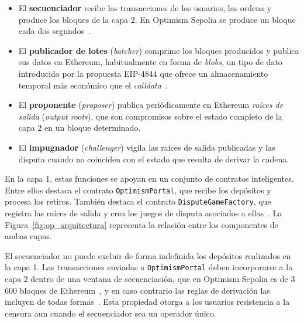 \begin{itemize}
	\item El \textbf{secuenciador} recibe las transacciones de los usuarios, las ordena y produce
	los bloques de la capa 2. En Optimism Sepolia se produce un bloque cada dos
	segundos~\cite{superchainopsepolia}.
	\item El \textbf{publicador de lotes} (\textit{batcher}) comprime los bloques producidos y
	publica sus datos en Ethereum, habitualmente en forma de \textit{blobs}, un tipo de dato
	introducido por la propuesta EIP-4844 que ofrece un almacenamiento temporal más económico que
	el \textit{calldata}~\cite{eip4844}.
	\item El \textbf{proponente} (\textit{proposer}) publica periódicamente en Ethereum
	\textit{raíces de salida} (\textit{output roots}), que son compromisos sobre el estado
	completo de la capa 2 en un bloque determinado.
	\item El \textbf{impugnador} (\textit{challenger}) vigila las raíces de salida publicadas y
	las disputa cuando no coinciden con el estado que resulta de derivar la cadena.
\end{itemize}

En la capa 1, estas funciones se apoyan en un conjunto de contratos inteligentes. Entre ellos
destaca el contrato \texttt{OptimismPortal}, que recibe los depósitos y procesa los retiros.
También destaca el contrato \texttt{DisputeGameFactory}, que registra las raíces de salida y crea
los juegos de disputa asociados a ellas~\cite{opspecsoverview}. La Figura~\ref{fig:op_arquitectura} representa la
relación entre los componentes de ambas capas.

El secuenciador no puede excluir de forma indefinida los depósitos realizados en la capa 1. Las
transacciones enviadas a \texttt{OptimismPortal} deben incorporarse a la capa 2 dentro de una
ventana de secuenciación, que en Optimism Sepolia es de 3\,600 bloques de
Ethereum~\cite{superchainopsepolia}, y en caso contrario las reglas de derivación las incluyen de
todas formas~\cite{opspecsoverview}. Esta propiedad otorga a los usuarios resistencia a la
censura aun cuando el secuenciador sea un operador único.


